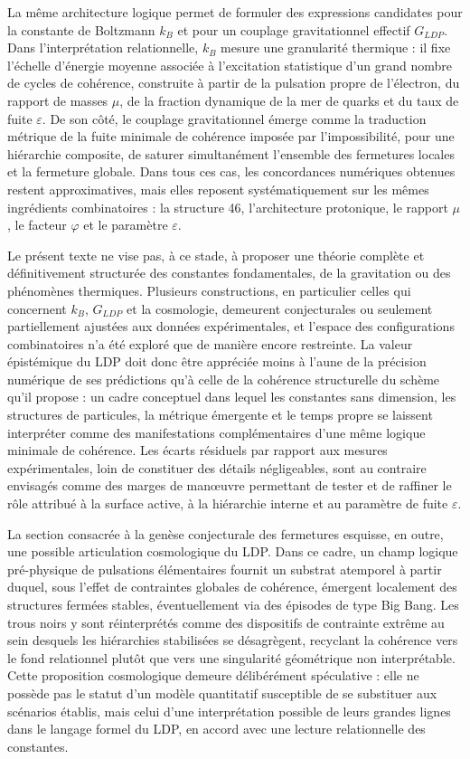 \documentclass[11pt,a4paper]{article}
\begin{document}
La même architecture logique permet de formuler des expressions candidates pour la constante de Boltzmann \(k_B\) et pour un couplage gravitationnel effectif \(G_{LDP}\). Dans l’interprétation relationnelle, \(k_B\) mesure une granularité thermique : il fixe l’échelle d’énergie moyenne associée à l’excitation statistique d’un grand nombre de cycles de cohérence, construite à partir de la pulsation propre de l’électron, du rapport de masses \(\mu\), de la fraction dynamique de la mer de quarks et du taux de fuite \(\varepsilon\). De son côté, le couplage gravitationnel émerge comme la traduction métrique de la fuite minimale de cohérence imposée par l’impossibilité, pour une hiérarchie composite, de saturer simultanément l’ensemble des fermetures locales et la fermeture globale. Dans tous ces cas, les concordances numériques obtenues restent approximatives, mais elles reposent systématiquement sur les mêmes ingrédients combinatoires : la structure 46, l’architecture protonique, le rapport \(\mu\), le facteur \(\varphi\) et le paramètre \(\varepsilon\).

Le présent texte ne vise pas, à ce stade, à proposer une théorie complète et définitivement structurée des constantes fondamentales, de la gravitation ou des phénomènes thermiques. Plusieurs constructions, en particulier celles qui concernent \(k_B\), \(G_{LDP}\) et la cosmologie, demeurent conjecturales ou seulement partiellement ajustées aux données expérimentales, et l’espace des configurations combinatoires n’a été exploré que de manière encore restreinte. La valeur épistémique du LDP doit donc être appréciée moins à l’aune de la précision numérique de ses prédictions qu’à celle de la cohérence structurelle du schème qu’il propose : un cadre conceptuel dans lequel les constantes sans dimension, les structures de particules, la métrique émergente et le temps propre se laissent interpréter comme des manifestations complémentaires d’une même logique minimale de cohérence. Les écarts résiduels par rapport aux mesures expérimentales, loin de constituer des détails négligeables, sont au contraire envisagés comme des marges de manœuvre permettant de tester et de raffiner le rôle attribué à la surface active, à la hiérarchie interne et au paramètre de fuite \(\varepsilon\). 

La section consacrée à la genèse conjecturale des fermetures esquisse, en outre, une possible articulation cosmologique du LDP. Dans ce cadre, un champ logique pré-physique de pulsations élémentaires fournit un substrat atemporel à partir duquel, sous l’effet de contraintes globales de cohérence, émergent localement des structures fermées stables, éventuellement via des épisodes de type Big Bang. Les trous noirs y sont réinterprétés comme des dispositifs de contrainte extrême au sein desquels les hiérarchies stabilisées se désagrègent, recyclant la cohérence vers le fond relationnel plutôt que vers une singularité géométrique non interprétable. Cette proposition cosmologique demeure délibérément spéculative : elle ne possède pas le statut d’un modèle quantitatif susceptible de se substituer aux scénarios établis, mais celui d’une interprétation possible de leurs grandes lignes dans le langage formel du LDP, en accord avec une lecture relationnelle des constantes.
\end{document}
